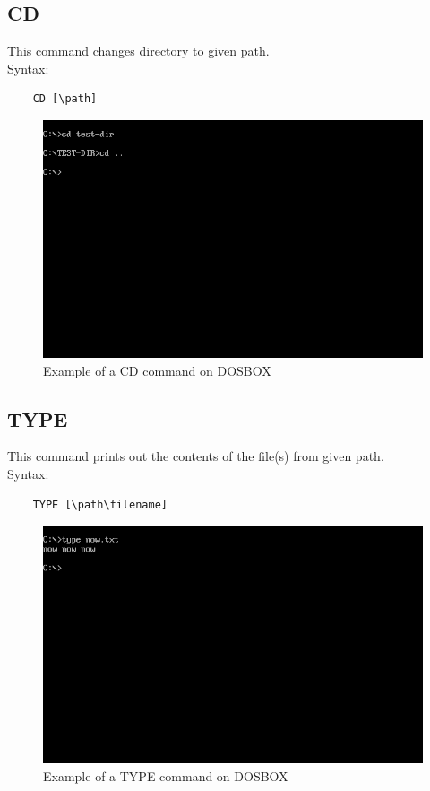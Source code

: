 \documentclass[17pt,a4paper,oneside,margin=1in]{article}
\begin{document}
\subsection{CD}
This command changes directory to given path. \\
Syntax: \\
\begin{verbatim}
	CD [\path] 	
\end{verbatim}
\begin{figure}[h]
	\caption{Example of a CD command on DOSBOX}
	\centering
	\includegraphics[width=1\textwidth]{./scrot/cd.png}
\end{figure}
\pagebreak


\subsection{TYPE}
This command prints out the contents of the file(s) from given path. \\
Syntax: \\
\begin{verbatim}
	TYPE [\path\filename] 	
\end{verbatim}
\begin{figure}[h]
	\caption{Example of a TYPE command on DOSBOX}
	\centering
	\includegraphics[width=1\textwidth]{./scrot/type.png}
\end{figure}
\pagebreak
\end{document}

